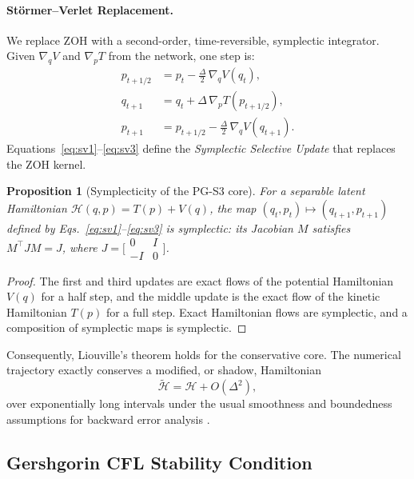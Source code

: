 \documentclass[10pt,twocolumn]{article}
\newcommand{\calH}{\mathcal{H}}
\newtheorem{proposition}{Proposition}
\begin{document}
\paragraph{St\"{o}rmer--Verlet Replacement.}
We replace ZOH with a second-order, time-reversible, symplectic integrator.
Given $\nabla_q V$ and $\nabla_p T$ from the network, one step is:
\begin{align}
  p_{t+1/2} &= p_t - \tfrac{\Delta}{2}\,\nabla_q V(q_t), \label{eq:sv1}\\
  q_{t+1}   &= q_t + \Delta\,\nabla_p T(p_{t+1/2}),     \label{eq:sv2}\\
  p_{t+1}   &= p_{t+1/2} - \tfrac{\Delta}{2}\,\nabla_q V(q_{t+1}). \label{eq:sv3}
\end{align}
Equations~\eqref{eq:sv1}--\eqref{eq:sv3} define the
\textit{Symplectic Selective Update} that replaces the ZOH kernel.

\begin{proposition}[Symplecticity of the PG-S3 core]
For a separable latent Hamiltonian
$\calH(q,p)=T(p)+V(q)$, the map
$(q_t,p_t)\mapsto(q_{t+1},p_{t+1})$ defined by
Eqs.~\eqref{eq:sv1}--\eqref{eq:sv3} is symplectic: its Jacobian $M$
satisfies $M^{\top}JM=J$, where
$J=\bigl[\begin{smallmatrix}0&I\\-I&0\end{smallmatrix}\bigr]$.
\end{proposition}

\begin{proof}
The first and third updates are exact flows of the potential Hamiltonian
$V(q)$ for a half step, and the middle update is the exact flow of the
kinetic Hamiltonian $T(p)$ for a full step. Exact Hamiltonian flows are
symplectic, and a composition of symplectic maps is symplectic.
\end{proof}

Consequently, Liouville's theorem holds for the conservative core.
The numerical trajectory exactly conserves a modified, or shadow,
Hamiltonian
\begin{equation}
  \tilde{\calH} = \calH + O(\Delta^2),
  \label{eq:shadow_hamiltonian}
\end{equation}
over exponentially long intervals under the usual smoothness and boundedness
assumptions for backward error analysis \cite{hairer2006geometric}.

\subsection{Gershgorin CFL Stability Condition}
\label{sec:cfl}
\end{document}
